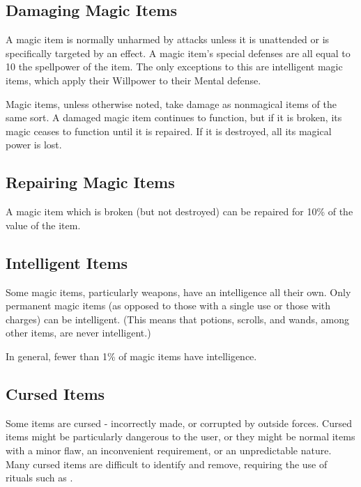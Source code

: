         \subsection{Damaging Magic Items}

            A magic item is normally unharmed by attacks unless it is unattended or is specifically targeted by an effect.
            A magic item's special defenses are all equal to 10 \add the spellpower of the item.
            The only exceptions to this are intelligent magic items, which apply their Willpower to their Mental defense.

            Magic items, unless otherwise noted, take damage as nonmagical items of the same sort.
            A damaged magic item continues to function, but if it is broken, its magic ceases to function until it is repaired.
            If it is destroyed, all its magical power is lost.

        \subsection{Repairing Magic Items}

            A magic item which is broken (but not destroyed) can be repaired for 10\% of the value of the item.

        \subsection{Intelligent Items}

            Some magic items, particularly weapons, have an intelligence all their own.
            Only permanent magic items (as opposed to those with a single use or those with charges) can be intelligent.
            (This means that potions, scrolls, and wands, among other items, are never intelligent.)

            In general, fewer than 1\% of magic items have intelligence.

        \subsection{Cursed Items}

            Some items are cursed - incorrectly made, or corrupted by outside forces.
            Cursed items might be particularly dangerous to the user, or they might be normal items with a minor flaw, an inconvenient requirement, or an unpredictable nature.
            Many cursed items are difficult to identify and remove, requiring the use of rituals such as .
